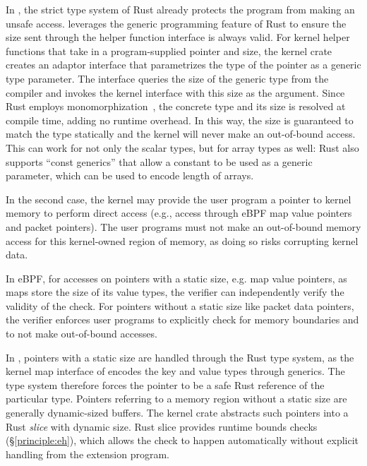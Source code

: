 In \projname{}, the strict type system of Rust already protects the program
    from making an unsafe access.
\projname{} leverages the generic programming feature of Rust to ensure the
    size sent through the helper function interface is always valid.
For kernel helper functions that take in a
    program-supplied pointer and size, the \projname{} kernel crate creates an
    adaptor interface that parametrizes the type of the pointer as a generic
    type parameter.
The interface queries the size of the generic type from the compiler
    and invokes the kernel interface with this size as the argument.
Since Rust employs monomorphization~\cite{rustc-monomorphize}, the concrete
    type and its size is resolved at compile time, adding no runtime overhead.
In this way, the size is guaranteed to match the type statically and the
    kernel will never make an out-of-bound access.
This can work for not only the scalar types, but for array types as well: Rust
    also supports ``const generics'' that allow a constant to be used as a
    generic parameter, which can be used to encode length of arrays.

In the second case, the kernel may provide the user program a pointer to
    kernel memory to perform direct access (e.g., access through eBPF map value
    pointers and packet pointers).
The user programs must not make an out-of-bound memory access for this
    kernel-owned region of memory, as doing so risks corrupting kernel data.

In eBPF, for accesses on pointers with a static size, e.g. map value pointers,
    as maps store the size of its value types, the verifier can independently
    verify the validity of the check.
For pointers without a static size like packet data pointers, the verifier
    enforces user programs to explicitly check for memory
    boundaries and to not make out-of-bound accesses.

In \projname{}, pointers with a static size are handled through the Rust type
    system, as the
    kernel map interface of \projname{} encodes the key and value types through
    generics.
The type system therefore forces the pointer to be a safe Rust reference of
    the particular type.
Pointers referring to a memory region without a static size are generally
    dynamic-sized buffers.
The \projname{} kernel crate abstracts such pointers into a Rust \emph{slice}
    with dynamic size.
Rust slice provides runtime bounds checks (\S\ref{principle:eh}), which allows
    the check to happen automatically without explicit handling from the
    extension program.

